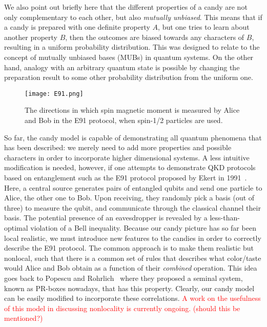 \documentclass{article}
\def \todo #1{\textcolor{red}{#1}}
\begin{document}
We also point out briefly here that the different properties of a candy are not only complementary to each other, but also \textit{mutually unbiased}.
This means that if a candy is prepared with one definite property $A$, but one tries to learn about another property $B$, then the outcomes are biased towards any characters of $B$, resulting in a uniform probability distribution.
This was designed to relate to the concept of mutually unbiased bases (MUBs) in quantum systems.
On the other hand, analogy with an arbitrary quantum state is possible by changing the preparation result to some other probability distribution from the uniform one.

\begin{figure}[ht]
	\centering
	\texttt{[image: E91.png]}
	\caption{The directions in which spin magnetic moment is measured by Alice and Bob in the E91 protocol, when spin-1/2 particles are used.} 
	\label{E91}
\end{figure}

So far, the candy model is capable of demonstrating all quantum phenomena that has been described: we merely need to add more properties and possible characters in order to incorporate higher dimensional systems.
A less intuitive modification is needed, however, if one attempts to demonstrate QKD protocols based on entanglement such as the E91 protocol proposed by Ekert in 1991~\cite{Ekert1991quantum}.
Here, a central source generates pairs of entangled qubits and send one particle to Alice, the other one to Bob.
Upon receiving, they randomly pick a basis (out of three) to measure the qubit, and communicate through the classical channel their basis.
The potential presence of an eavesdropper is revealed by a less-than-optimal violation of a Bell inequality.
Because our candy picture has so far been local realistic, we must introduce new features to the candies in order to correctly describe the E91 protocol.
The common approach is to make them realistic but nonlocal, such that there is a common set of rules that describes what color/taste would Alice and Bob obtain as a function of their \textit{combined} operation.
This idea goes back to Popescu and Rohrlich~\cite{popescu1994quantum} where they proposed a seminal system, known as PR-boxes nowadays, that has this property.
Clearly, our candy model can be easily modified to incorporate these correlations.
\todo{A work on the usefulness of this model in discussing nonlocality is currently ongoing. (should this be mentioned?)}
\end{document}
